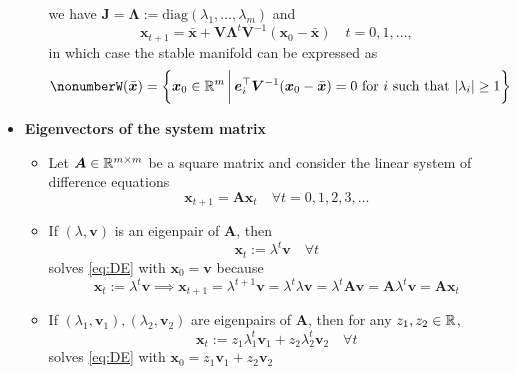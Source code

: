 \documentclass[12pt,a4paper]{article}
\begin{document}
\begin{itemize}
\begin{itemize}
    we have $\bm{J}=\bm{\Lambda}:=\text{diag}(\lambda_{1},\ldots,\lambda_{m})$ and
    \begin{equation}\nonumber%
      \bm{x}_{t+1} = \bar{\bm{x}} +  \bm{V}\bm{\Lambda}^{t}\bm{V}^{-1}(\bm{x}_{0}-\bar{\bm{x}})
      \quad t = 0, 1, \ldots,
    \end{equation}
    in which case the stable manifold can be expressed as
    \begin{equation}\nonumber%
      W(\bar{\bm{x}}) =
      \left\{ \bm{x}_{0} \in \R^{m}
        \,\bigg|\,
        \text{$\bm{e}_{i}^{\top}\bm{V}^{-1}(\bm{x}_{0}-\bar{\bm{x}}) = 0$ for $i$ such that $|\lambda_{i}|\geq 1$}
      \right\}
    \end{equation}

  \end{itemize}

\item \textbf{Eigenvectors of the system matrix}

  \begin{itemize}
  \item Let $\bm{A}\in \mathbb{R}^{m\times m}$ be a square matrix and consider the linear system of difference equations
    \begin{equation}\label{eq:DE}%
      \bm{x}_{t+1} = \bm{A}\bm{x}_{t} \quad \forall t= 0, 1, 2, 3, \ldots
    \end{equation}
  \item If $(\lambda, \bm{v})$ is an eigenpair of $\bm{A}$,
    then 
    \begin{equation}\nonumber%
      \bm{x}_{t} := \lambda^{t}\bm{v} \quad \forall t
    \end{equation}
    solves \eqref{eq:DE} with $\bm{x}_{0}=\bm{v}$ because
    \begin{equation}\nonumber%
      \bm{x}_{t} := \lambda^{t}\bm{v}
      \implies
      \bm{x}_{t+1}
      = \lambda^{t+1}\bm{v}
      = \lambda^{t}\lambda \bm{v}
      = \lambda^{t}\bm{A} \bm{v}
      = \bm{A} \lambda^{t}\bm{v}
      = \bm{A} \bm{x}_{t}
    \end{equation}
    
  \item If $(\lambda_{1}, \bm{v}_{1}), (\lambda_{2}, \bm{v}_{2})$ are eigenpairs of $\bm{A}$,
    then for any $z_{1}, z_{2}\in \mathbb{R}$,
    \begin{equation}\nonumber%
      \bm{x}_{t} := z_{1}\lambda_{1}^{t}\bm{v}_{1} + z_{2}\lambda_{2}^{t}\bm{v}_{2} \quad \forall t
    \end{equation}
    solves \eqref{eq:DE} with $\bm{x}_{0}=z_{1}\bm{v}_{1} + z_{2}\bm{v}_{2}$


\end{itemize}
\end{itemize}
\end{document}
